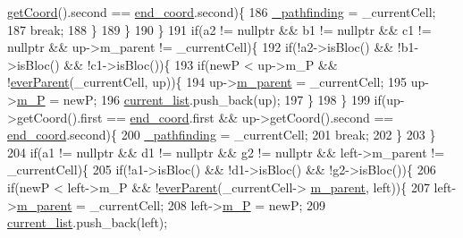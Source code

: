\begin{DoxyCode}
      \hyperlink{classCellule_a50698c84ba5a043a148a594552189427}{getCoord}().second == \hyperlink{classPathFinding_a7db7c62b00778fb60be8fdb10c471851}{end\_coord}.second)\{
186                         \hyperlink{classPathFinding_ada148538e4a78dcc97f24ae74156abd4}{\_pathfinding} = \_currentCell;
187                         \textcolor{keywordflow}{break};
188                     \}
189                 \}
190             \}
191             \textcolor{keywordflow}{if}(a2 != \textcolor{keyword}{nullptr} && b1 != \textcolor{keyword}{nullptr} && c1 != \textcolor{keyword}{nullptr} && up->m\_parent != \_currentCell)\{
192                 \textcolor{keywordflow}{if}(!a2->isBloc() && !b1->isBloc() && !c1->isBloc())\{
193                     \textcolor{keywordflow}{if}(newP < up->m\_P && !\hyperlink{classPathFinding_a2cb53ee646709c2367a6819d758ec7c3}{everParent}(\_currentCell, up))\{
194                         up->\hyperlink{classCellule_a3f4117017976fde614e72d38ea10d734}{m\_parent} = \_currentCell;
195                         up->\hyperlink{classCellule_af7cb9856701ea3e423f58b09bb7dfdbd}{m\_P} = newP;
196                         \hyperlink{classPathFinding_aac0f1388f79b45388470d634c909174e}{current\_list}.push\_back(up);
197                     \}
198                 \}
199                 \textcolor{keywordflow}{if}(up->getCoord().first == \hyperlink{classPathFinding_a7db7c62b00778fb60be8fdb10c471851}{end\_coord}.first && up->getCoord().second == 
      \hyperlink{classPathFinding_a7db7c62b00778fb60be8fdb10c471851}{end\_coord}.second)\{
200                     \hyperlink{classPathFinding_ada148538e4a78dcc97f24ae74156abd4}{\_pathfinding} = \_currentCell;
201                     \textcolor{keywordflow}{break};
202                 \}
203             \}
204             \textcolor{keywordflow}{if}(a1 != \textcolor{keyword}{nullptr} && d1 != \textcolor{keyword}{nullptr} && g2 != \textcolor{keyword}{nullptr} && left->m\_parent != \_currentCell)\{
205                 \textcolor{keywordflow}{if}(!a1->isBloc() && !d1->isBloc() && !g2->isBloc())\{
206                     \textcolor{keywordflow}{if}(newP < left->m\_P && !\hyperlink{classPathFinding_a2cb53ee646709c2367a6819d758ec7c3}{everParent}(\_currentCell->
      \hyperlink{classCellule_a3f4117017976fde614e72d38ea10d734}{m\_parent}, left))\{
207                         left->\hyperlink{classCellule_a3f4117017976fde614e72d38ea10d734}{m\_parent} = \_currentCell;
208                         left->\hyperlink{classCellule_af7cb9856701ea3e423f58b09bb7dfdbd}{m\_P} = newP;
209                         \hyperlink{classPathFinding_aac0f1388f79b45388470d634c909174e}{current\_list}.push\_back(left);

\end{DoxyCode}
